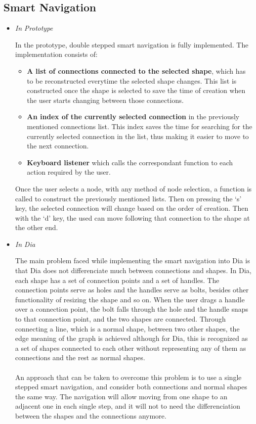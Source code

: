 \subsection{Smart Navigation}
\begin{itemize}
\item {\it In Prototype}
\par \noindent
In the prototype, double stepped smart navigation is fully implemented. 
The implementation consists of:
\begin{itemize}
\item {\bf A list of connections connected to the selected shape}, which has to be reconstructed everytime the selected shape changes. This list is constructed once the shape is selected to save the time of creation when the user starts changing between those connections.
\item {\bf An index of the currently selected connection} in the previously mentioned connections list. This index saves the time for searching for the currently selected connection in the list, thus making it easier to move to the next connection.
\item {\bf Keyboard listener} which calls the correspondant function to each action required by the user.
\end{itemize}
Once the user selects a node, with any method of node selection, a function is called to construct the previously mentioned lists. Then on pressing the `s' key, the selected connection will change based on the order of creation. Then with the `d' key, the used can move following that connection to the shape at the other end.


\item {\it In Dia}
\par \noindent
The main problem faced while implementing the smart navigation into Dia is that Dia does not differenciate much between connections and shapes. In Dia, each shape has a set of connection points and a set of handles. The connection points serve as holes and the handles serve as bolts, besides other functionality of resizing the shape and so on. When the user drags a handle over a connection point, the bolt falls through the hole and the handle snaps to that connection point, and the two shapes are connected. Through connecting a line, which is a normal shape, between two other shapes, the edge meaning of the graph is achieved although for Dia, this is recognized as a set of shapes connected to each other without representing any of them as connections and the rest as normal shapes.

\paragraph{}
An approach that can be taken to overcome this problem is to use a single stepped smart navigation, and consider both connections and normal shapes the same way. The navigation will allow moving from one shape to an adjacent one in each single step, and it will not to need the differenciation between the shapes and the connections anymore.
\end{itemize}

